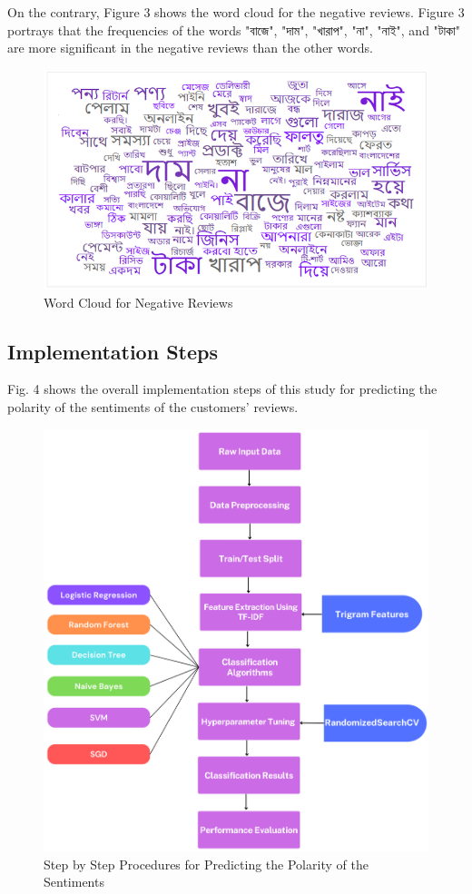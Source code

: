 \documentclass[conference]{IEEEtran}
\begin{document}
On the contrary, Figure 3 shows the word cloud for the negative reviews. Figure 3 portrays that the frequencies of the words \bn "বাজে", "দাম", "খারাপ", "না", "নাই", and "টাকা"  are more significant in the negative reviews than the other words. 

\begin{figure}[htbp]
  \centering
\includegraphics[width=\columnwidth,height=\textheight,keepaspectratio]{snipkharap.png}
  \caption{Word Cloud for Negative Reviews}
  \label{fig:scope1}
\end{figure}


\subsection{Implementation Steps}
Fig. 4 shows the overall implementation steps of this study for predicting the polarity of the sentiments of the customers' reviews.

\begin{figure}[htbp]
  \centering
\includegraphics[width=\columnwidth,height=\textheight,keepaspectratio]{methodology.png}
  \caption{Step by Step Procedures for Predicting the Polarity of the Sentiments}
  \label{fig:scope1}
\end{figure}
\end{document}
